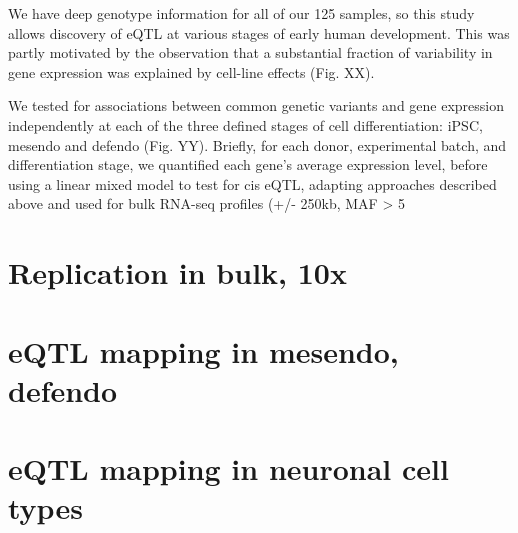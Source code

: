 We have deep genotype information for all of our 125 samples, so this study allows discovery of eQTL at various stages of early human development. This was partly motivated by the observation that a substantial fraction of variability in gene expression was explained by cell-line effects (Fig. XX).
 
We tested for associations between common genetic variants and gene expression independently at each of the three defined stages of cell differentiation: iPSC, mesendo and defendo (Fig. YY). Briefly, for each donor, experimental batch, and differentiation stage, we quantified each gene’s average expression level, before using a linear mixed model to test for cis eQTL, adapting approaches described above and used for bulk RNA-seq profiles (+/- 250kb, MAF > 5%


\section{Replication in bulk, 10x}

\section{eQTL mapping in mesendo, defendo}

\section{eQTL mapping in neuronal cell types}

